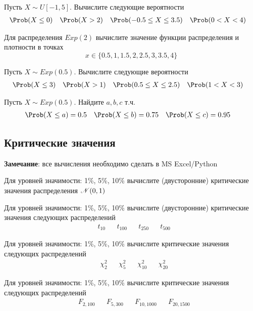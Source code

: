 \begin{exercise}
Пусть \(X\sim U[-1, 5]\). Вычислите следующие вероятности
\begin{align*}
	&\Prob(X\leq0) & &\Prob(X>2) & 
	&\Prob(-0.5\leq X\leq3.5) & &\Prob(0<X<4)
\end{align*}
\end{exercise}

\begin{exercise}
Для распределения \(Exp(2)\) 
вычислите значение функции распределения и плотности в точках
\[
	x\in\{0.5, 1, 1.5, 2, 2.5, 3, 3.5, 4\}
\]
\end{exercise}

\begin{exercise}
Пусть \(X\sim Exp(0.5)\). Вычислите следующие вероятности
\begin{align*}
	&\Prob(X\leq3) & &\Prob(X>1) & 
	&\Prob(0.5\leq X\leq2.5) & &\Prob(1<X<3)
\end{align*}
\end{exercise}

\begin{exercise}
Пусть \(X\sim Exp(0.5)\). Найдите \(a,b,c\) т.ч.
\begin{align*}
	&\Prob(X\leq a)=0.5 & &\Prob(X\leq b)=0.75 & 
	&\Prob(X\leq c)=0.95
\end{align*}
\end{exercise}

\subsection{Критические значения}

\textbf{Замечание}: все вычисления необходимо сделать в MS Excel/Python

\begin{exercise}
Для уровней значимости: 1\%, 5\%, 10\% вычислите (двусторонние) 
критические значения распределения \({\mathscr N}(0,1)\)
\end{exercise}

\begin{exercise}
Для уровней значимости: 1\%, 5\%, 10\% вычислите (двусторонние) 
критические значения следующих распределений
\begin{align*}
	&t_{10} & &t_{100} & &t_{250} & &t_{500}
\end{align*}
\end{exercise}

\begin{exercise}
Для уровней значимости: 1\%, 5\%, 10\% вычислите
критические значения следующих распределений
\begin{align*}
	&\chi^2_{2} & &\chi^2_{5} & &\chi^2_{10} & &\chi^2_{20}
\end{align*}
\end{exercise}

\begin{exercise}
Для уровней значимости: 1\%, 5\%, 10\% вычислите
критические значения следующих распределений
\begin{align*}
	&F_{2,100} & &F_{5, 300} & &F_{10, 1000} & &F_{20, 1500}
\end{align*}
\end{exercise}